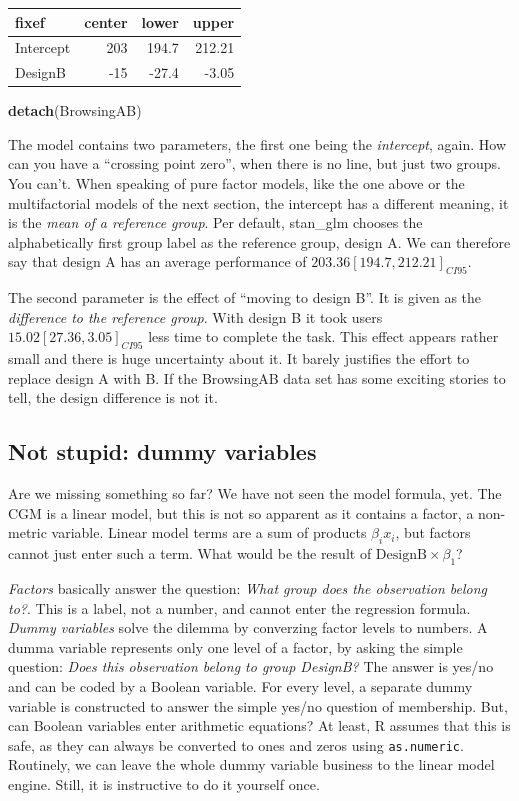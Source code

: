 \documentclass[]{svmono}
\newenvironment{Shaded}{\begin{snugshade}}{\end{snugshade}}
\newcommand{\KeywordTok}[1]{\textcolor[rgb]{0.13,0.29,0.53}{\textbf{#1}}}
\newcommand{\NormalTok}[1]{#1}
\theoremstyle{definition}
\theoremstyle{definition}
\theoremstyle{definition}
\theoremstyle{remark}
\begin{document}
\begin{longtable}[]{@{}lrrr@{}}
\toprule
fixef & center & lower & upper\tabularnewline
\midrule
\endhead
Intercept & 203 & 194.7 & 212.21\tabularnewline
DesignB & -15 & -27.4 & -3.05\tabularnewline
\bottomrule
\end{longtable}

\begin{Shaded}
\begin{Highlighting}[]
\KeywordTok{detach}\NormalTok{(BrowsingAB)}
\end{Highlighting}
\end{Shaded}

The model contains two parameters, the first one being the
\emph{intercept}, again. How can you have a ``crossing point zero'',
when there is no line, but just two groups. You can't. When speaking of
pure factor models, like the one above or the multifactorial models of
the next section, the intercept has a different meaning, it is the
\emph{mean of a reference group}. Per default, stan\_glm chooses the
alphabetically first group label as the reference group, design A. We
can therefore say that design A has an average performance of
\(203.36 [194.7, 212.21]_{CI95}\).

The second parameter is the effect of ``moving to design B''. It is
given as the \emph{difference to the reference group}. With design B it
took users \(15.02 [27.36, 3.05]_{CI95}\) less time to complete the
task. This effect appears rather small and there is huge uncertainty
about it. It barely justifies the effort to replace design A with B. If
the BrowsingAB data set has some exciting stories to tell, the design
difference is not it.

\subsection{Not stupid: dummy variables}\label{dummy_variables}

Are we missing something so far? We have not seen the model formula,
yet. The CGM is a linear model, but this is not so apparent as it
contains a factor, a non-metric variable. Linear model terms are a sum
of products \(\beta_ix_i\), but factors cannot just enter such a term.
What would be the result of \(\mathrm{DesignB} \times\beta_1\)?

\emph{Factors} basically answer the question: \emph{What group does the
observation belong to?}. This is a label, not a number, and cannot enter
the regression formula. \emph{Dummy variables} solve the dilemma by
converzing factor levels to numbers. A dumma variable represents only
one level of a factor, by asking the simple question: \emph{Does this
observation belong to group DesignB?} The answer is yes/no and can be
coded by a Boolean variable. For every level, a separate dummy variable
is constructed to answer the simple yes/no question of membership. But,
can Boolean variables enter arithmetic equations? At least, R assumes
that this is safe, as they can always be converted to ones and zeros
using \texttt{as.numeric}. Routinely, we can leave the whole dummy
variable business to the linear model engine. Still, it is instructive
to do it yourself once.
\end{document}
